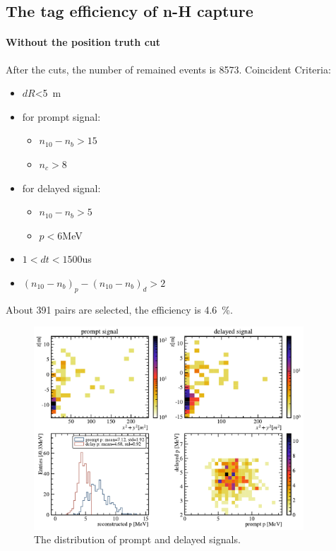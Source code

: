 \subsection{The tag efficiency of n-H capture}
\paragraph{Without the position truth cut}
After the cuts, the number of remained events is 8573.
Coincident Criteria:
\begin{itemize}
	\item $dR$<\SI{5}{m}
	\item {for prompt signal:
	      \begin{itemize}
		      \item $n_{10}-n_{b}>15$
		      \item $n_c>8$
	      \end{itemize}
	      }
	\item {for delayed signal:
	      \begin{itemize}
		      \item $n_{10}-n_{b}>5$
		      \item $p<6$\si{MeV}
	      \end{itemize}}
	\item $1<dt<1500$\si{us}
	\item $(n_{10}-n_{b})_p-(n_{10}-n_{b})_d>2$
\end{itemize}

About 391 pairs are selected, the efficiency is \SI{4.6}{\percent}.
\begin{figure}[!htbp]
	\centering
	\includegraphics[width=0.9\textwidth]{neutrontag/coin/3671_coin.pdf}
	\caption{The distribution of prompt and delayed signals.}
	\label{coin:pos0}
\end{figure}


